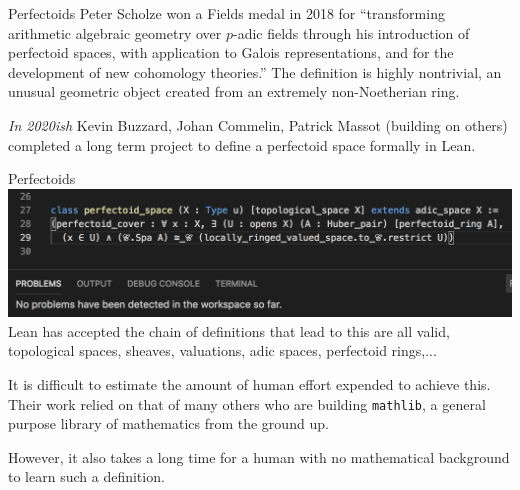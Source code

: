\documentclass{beamer}
\theoremstyle{plain}
\begin{document}



\begin{frame}{Perfectoids}
    Peter Scholze won a Fields medal in 2018 for ``transforming arithmetic algebraic geometry over $p$-adic fields through his introduction of perfectoid spaces, with application to Galois representations, and for the development of new cohomology theories.''
    \pause
    The definition is highly nontrivial, an unusual geometric object created from an extremely non-Noetherian ring.
    \pause

    \emph{In 2020ish} Kevin Buzzard, Johan Commelin, Patrick Massot  (building on others)  completed a long term project to define a perfectoid space formally in Lean.
\end{frame}

\begin{frame}{Perfectoids}
    \includegraphics[width=\textwidth]{perfectoid.png}
    Lean has accepted the chain of definitions that lead to this are all valid, topological spaces, sheaves, valuations, adic spaces, perfectoid rings,...
    \pause

    It is difficult to estimate the amount of human effort expended to achieve this. \pause
    Their work relied on that of many others who are building \texttt{mathlib}, a general purpose library of mathematics from the ground up. \pause

    However, it also takes a long time for a human with no mathematical background to learn such a definition.
\end{frame}
\end{document}
